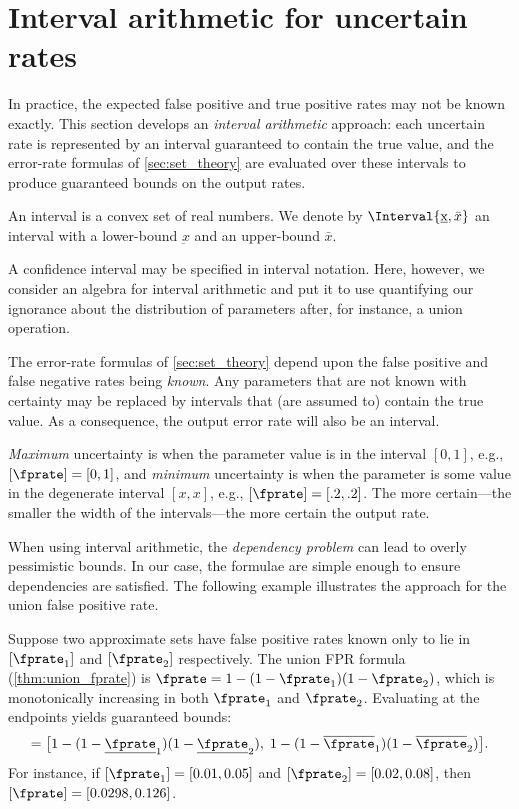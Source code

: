 
\section{Interval arithmetic for uncertain rates}
\label{sec:intervals}
In practice, the expected false positive and true positive rates may not be known exactly.
This section develops an \emph{interval arithmetic} approach: each uncertain rate is represented by an interval guaranteed to contain the true value, and the error-rate formulas of \cref{sec:set_theory} are evaluated over these intervals to produce guaranteed bounds on the output rates.

\begin{definition}
An interval is a convex set of real numbers.
We denote by $\Interval{\underbar{x},\bar{x}}$ an interval with a lower-bound $\underbar{x}$ and an upper-bound $\bar{x}$.
\end{definition}

A confidence interval may be specified in interval notation.
Here, however, we consider an algebra for interval arithmetic and put it to use quantifying our ignorance about the distribution of parameters after, for instance, a union operation.

The error-rate formulas of \cref{sec:set_theory} depend upon the false positive and false negative rates being \emph{known}.
Any parameters that are not known with certainty may be replaced by intervals that (are assumed to) contain the true value.
As a consequence, the output error rate will also be an interval.

\emph{Maximum} uncertainty is when the parameter value is in the interval $[0,1]$, e.g., $[\fprate] = [0,1]$, and \emph{minimum} uncertainty is when the parameter is some value in the degenerate interval $[x,x]$, e.g., $[\fprate] = [.2,.2]$. The more certain---the smaller the width of the intervals---the more certain the output rate.

When using interval arithmetic, the \emph{dependency problem} can lead to overly pessimistic bounds.
In our case, the formulae are simple enough to ensure dependencies are satisfied. The following example illustrates the approach for the union false positive rate.

\begin{example}
	Suppose two approximate sets have false positive rates known only to lie in $[\fprate_1]$ and $[\fprate_2]$ respectively.
	The union FPR formula (\cref{thm:union_fprate}) is $\fprate = 1 - (1-\fprate_1)(1-\fprate_2)$, which is monotonically increasing in both $\fprate_1$ and $\fprate_2$.
	Evaluating at the endpoints yields guaranteed bounds:
	\begin{equation}
		[\fprate] = \bigl[1 - (1 - \underline{\fprate}_1)(1 - \underline{\fprate}_2),\;
		             1 - (1 - \overline{\fprate}_1)(1 - \overline{\fprate}_2)\bigr].
	\end{equation}
	For instance, if $[\fprate_1] = [0.01, 0.05]$ and $[\fprate_2] = [0.02, 0.08]$, then $[\fprate] = [0.0298, 0.126]$.
\end{example}

